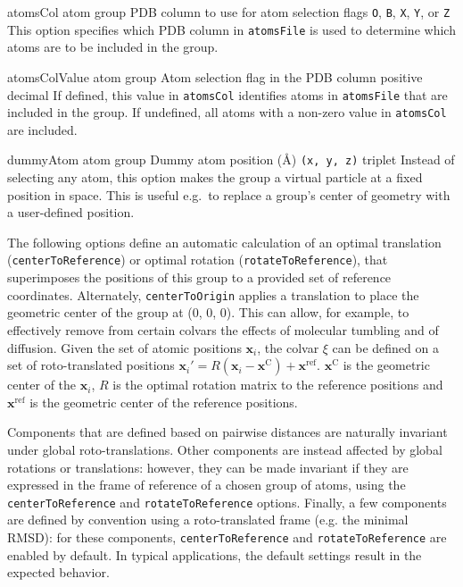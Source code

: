 \begin{itemize}
{\item %
  \key%
    {atomsCol}{%
    atom group}{%
    PDB column to use for atom selection flags}{%
    \texttt{O}, \texttt{B}, \texttt{X}, \texttt{Y}, or \texttt{Z}}{%
    This option specifies which PDB column in \texttt{atomsFile} is used to determine which atoms are to be included in the group.
  }

\item %
  \key%
    {atomsColValue}{%
    atom group}{%
    Atom selection flag in the PDB column}{%
    positive decimal}{%
    If defined, this value in \texttt{atomsCol} identifies atoms in \texttt{atomsFile} that are included in the group.
    If undefined, all atoms with a non-zero value in \texttt{atomsCol} are included.}
}

\item %
  \key
    {dummyAtom}{%
    atom group}{%
    Dummy atom position (\AA{})}{%
    \texttt{(x, y, z)} triplet}{%
    Instead of selecting any atom, this option makes the group a virtual particle at a fixed position in space.  This is useful e.g.~to replace a group's center of geometry with a user-defined position.}

\end{itemize}


The following options define an automatic calculation of an optimal translation (\texttt{centerToReference}) or optimal rotation (\texttt{rotateToReference}), that superimposes the positions of this group to a provided set of reference coordinates.
Alternately, \texttt{centerToOrigin} applies a translation to place the geometric center of the group at (0, 0, 0).
This can allow, for example, to effectively remove from certain colvars the effects of molecular tumbling and of diffusion.
Given the set of atomic positions $\mathbf{x}_{i}$, the colvar $\xi$ can be defined on a set of roto-translated positions $\mathbf{x}_{i}' = R(\mathbf{x}_{i} - \mathbf{x}^{\mathrm{C}}) + \mathbf{x}^{\mathrm{ref}}$.
$\mathbf{x}^{\mathrm{C}}$ is the geometric center of the $\mathbf{x}_{i}$, $R$ is the optimal rotation matrix to the reference positions and $\mathbf{x}^{\mathrm{ref}}$ is the geometric center of the reference positions.

Components that are defined based on pairwise distances are naturally invariant under global roto-translations.
Other components are instead affected by global rotations or translations: however, they can be made invariant if they are expressed in the frame of reference of a chosen group of atoms, using the \texttt{centerToReference} and \texttt{rotateToReference} options.
Finally, a few components are defined by convention using a roto-translated frame (e.g. the minimal RMSD): for these components, \texttt{centerToReference} and \texttt{rotateToReference} are enabled by default.
In typical applications, the default settings result in the expected behavior.

